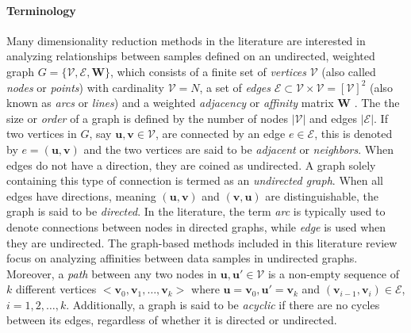 \paragraph{Terminology}
Many dimensionality reduction methods in the literature are interested in analyzing relationships between samples defined on an undirected, weighted graph $G = \{ \mathcal{V}, \mathcal{E}, \bm{W} \}$, which consists of a finite set of \textit{vertices}  $\mathcal{V}$ (also called \textit{nodes} or \textit{points}) with cardinality $\mathcal{V}=N$, a set of \textit{edges} $\mathcal{E} \subset \mathcal{V} \times \mathcal{V} = [\mathcal{V}]^{2}$ (also known as \textit{arcs} or \textit{lines}) and a weighted \textit{adjacency} or \textit{affinity} matrix $\bm{W}$ \citep{Shuman2013SignalProcessingGraphs, Livi2013GraphMatchingProblem, Bengoetxea2002ThesisGraphMatching}.  The the size or \textit{order} of a graph is defined by the number of nodes $|\mathcal{V}|$ and edges $|\mathcal{E}|$.  If two vertices in $G$, say $\bm{u},\bm{v} \in \mathcal{V}$, are connected by an edge $e \in \mathcal{E}$, this is denoted by $e=(\bm{u},\bm{v})$ and the two vertices are said to be \textit{adjacent} or \textit{neighbors}.  When edges do not have a direction, they are coined as undirected.  A graph solely containing this type of connection is termed as an \textit{undirected graph}.  When all edges have directions, meaning $(\bm{u},\bm{v})$ and $(\bm{v},\bm{u})$ are distinguishable, the graph is said to be \textit{directed}.  In the literature, the term \textit{arc} is typically used to denote connections between nodes in directed graphs, while \textit{edge} is used when they are undirected.  The graph-based methods included in this literature review focus on analyzing affinities between data samples in undirected graphs.  Moreover, a \textit{path} between any two nodes in $\bm{u},\bm{u'} \in \mathcal{V}$ is a non-empty sequence of $k$ different vertices $<\bm{v}_{0}, \bm{v}_{1}, \dots, \bm{v}_{k}>$ where $\bm{u}=\bm{v}_{0},\bm{u}'=\bm{v}_{k}$ and $(\bm{v}_{i-1},\bm{v}_{i})\in \mathcal{E}$, $i=1,2,\dots,k$.  Additionally, a graph is said to be \textit{acyclic} if there are no cycles between its edges, regardless of whether it is directed or undirected.  

